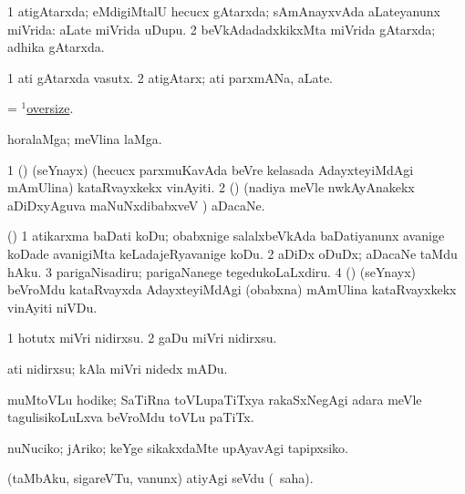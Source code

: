 \bentry
{}
\gl{\gu}
\bmng
\bnum
\num{1} atigAtarxda; eMdigiMtalU hecucx gAtarxda; sAmAnayxvAda aLateyanunx miVrida:  aLate miVrida uDupu. 
\num{2} beVkAdadadxkikxMta miVrida gAtarxda; adhika gAtarxda. 
\enum
\emng
\eentry


\bentry
{}
\gl{\nA}
\bmng
\bnum
\num{1} ati gAtarxda vasutx. 
\num{2} atigAtarx; ati parxmANa, aLate. 
\enum
\emng
\eentry


\bentry
{}
\gl{\gu}
\bmng
= \hyperlink{oversize(1)}{$^1$oversize}. 
\emng
\eentry


\bentry
{}
\gl{\nA}
\bmng
horalaMga; meVlina laMga. 
\emng
\eentry


\bentry
{}
\gl{\nA}
\bmng
\bnum
\num{1} (\birx) (seYnayx) (hecucx parxmuKavAda beVre kelasada AdayxteyiMdAgi mAmUlina) kataRvayxkekx vinAyiti. 
\num{2} (\ame) (nadiya meVle nwkAyAnakekx aDiDxyAguva maNuNxdibabxveV \mo) aDacaNe. 
\enum
\emng
\eentry


\bentry
{}
\gl{\sakirx}
\bmng
(\ame) 
\bnum
\num{1} atikarxma baDati koDu; obabxnige salalxbeVkAda baDatiyanunx avanige koDade avanigiMta keLadajeRyavanige koDu. 
\num{2} aDiDx oDuDx; aDacaNe taMdu hAku.
\num{3} parigaNisadiru; parigaNanege tegedukoLaLxdiru. 
\num{4} (\birx) (seYnayx) beVroMdu kataRvayxda AdayxteyiMdAgi (obabxna) mAmUlina kataRvayxkekx vinAyiti niVDu. 
\enum
\emng
\eentry


\bentry
{}
\gl{\kirx}


\noindent
\gl{\sakirx}
\bmng
\bnum
\num{1} hotutx miVri nidirxsu. 
\num{2} gaDu miVri nidirxsu. 
\enum
\emng

\noindent
\gl{\akirx}
\bmng
ati nidirxsu; kAla miVri nidedx mADu. 
\emng
\eentry


\bentry
{}
\gl{\nA}
\bmng
muMtoVLu hodike; SaTiRna toVLupaTiTxya rakaSxNegAgi adara meVle tagulisikoLuLxva beVroMdu toVLu paTiTx. 
\emng
\eentry


\bentry
{}
\gl{\sakirx}
\bmng
nuNuciko; jAriko; keYge sikakxdaMte upAyavAgi tapipxsiko. 
\emng
\eentry


\bentry
{}
\gl{\sakirx}
\bmng
(taMbAku, sigareVTu, \mo vanunx) atiyAgi seVdu (\akirx\ saha). 
\emng
\eentry


